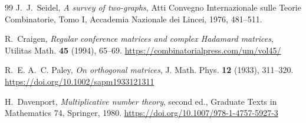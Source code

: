 \documentclass[11pt]{article}
\begin{document}
\begin{thebibliography}{99}
J.~J.~Seidel,
\emph{A survey of two-graphs},
Atti Convegno Internazionale sulle Teorie Combinatorie, Tomo I,
Accademia Nazionale dei Lincei, 1976, 481--511.

R.~Craigen,
\emph{Regular conference matrices and complex Hadamard matrices},
Utilitas Math. \textbf{45} (1994), 65--69.
\url{https://combinatorialpress.com/um/vol45/}

R.~E. A.~C. Paley,
\emph{On orthogonal matrices},
J. Math. Phys. \textbf{12} (1933), 311--320.
\url{https://doi.org/10.1002/sapm1933121311}

H.~Davenport,
\emph{Multiplicative number theory}, second ed.,
Graduate Texts in Mathematics 74, Springer, 1980.
\url{https://doi.org/10.1007/978-1-4757-5927-3}

\end{thebibliography}
\end{document}
